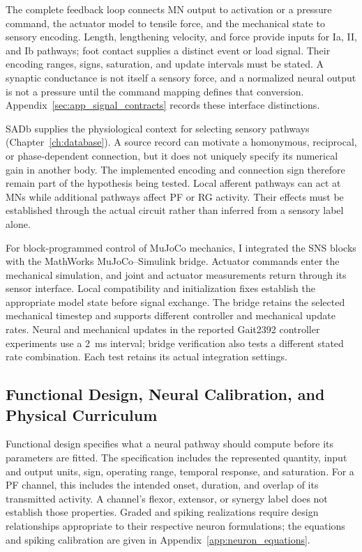 The complete feedback loop connects MN output to activation or a pressure command, the actuator model to tensile force, and the mechanical state to sensory encoding. Length, lengthening velocity, and force provide inputs for Ia, II, and Ib pathways; foot contact supplies a distinct event or load signal. Their encoding ranges, signs, saturation, and update intervals must be stated. A synaptic conductance is not itself a sensory force, and a normalized neural output is not a pressure until the command mapping defines that conversion. Appendix~\ref{sec:app_signal_contracts} records these interface distinctions.

SADb supplies the physiological context for selecting sensory pathways (Chapter~\ref{ch:database}). A source record can motivate a homonymous, reciprocal, or phase-dependent connection, but it does not uniquely specify its numerical gain in another body. The implemented encoding and connection sign therefore remain part of the hypothesis being tested. Local afferent pathways can act at MNs while additional pathways affect PF or RG activity. Their effects must be established through the actual circuit rather than inferred from a sensory label alone.

For block-programmed control of MuJoCo mechanics, I integrated the SNS blocks with the MathWorks MuJoCo--Simulink bridge. Actuator commands enter the mechanical simulation, and joint and actuator measurements return through its sensor interface. Local compatibility and initialization fixes establish the appropriate model state before signal exchange. The bridge retains the selected mechanical timestep and supports different controller and mechanical update rates. Neural and mechanical updates in the reported Gait2392 controller experiments use a \qty{2}{\milli\second} interval; bridge verification also tests a different stated rate combination. Each test retains its actual integration settings.

\subsection{Functional Design, Neural Calibration, and Physical Curriculum}\label{sec:sns_curriculum_main}\label{sec:sns_literature_methods}

Functional design specifies what a neural pathway should compute before its parameters are fitted. The specification includes the represented quantity, input and output units, sign, operating range, temporal response, and saturation. For a PF channel, this includes the intended onset, duration, and overlap of its transmitted activity. A channel's flexor, extensor, or synergy label does not establish those properties. Graded and spiking realizations require design relationships appropriate to their respective neuron formulations; the equations and spiking calibration are given in Appendix~\ref{app:neuron_equations}.

